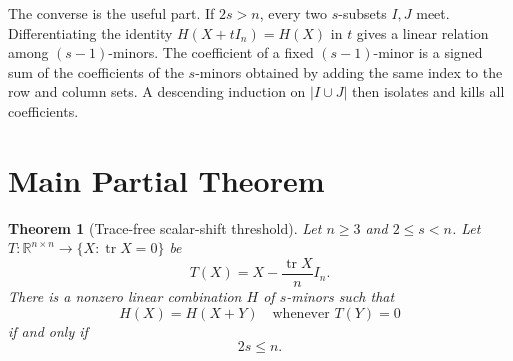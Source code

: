 \documentclass[11pt]{article}
\newtheorem{theorem}{Theorem}
\newcommand{\R}{\mathbb R}
\newcommand{\tr}{\operatorname{tr}}
\begin{document}
The converse is the useful part. If $2s>n$, every two $s$-subsets $I,J$ meet.
Differentiating the identity $H(X+tI_n)=H(X)$ in $t$ gives a linear relation
among $(s-1)$-minors. The coefficient of a fixed $(s-1)$-minor is a signed sum
of the coefficients of the $s$-minors obtained by adding the same index to the
row and column sets. A descending induction on $|I\cup J|$ then isolates and
kills all coefficients.

\section*{Main Partial Theorem}

\begin{theorem}[Trace-free scalar-shift threshold]
\label{thm:main}
Let $n\ge3$ and $2\le s<n$. Let $T:\R^{n\times n}\to\{X:\tr X=0\}$ be
\[
  T(X)=X-\frac{\tr X}{n}I_n.
\]
There is a nonzero linear combination $H$ of $s$-minors such that
\[
  H(X)=H(X+Y)\quad\text{whenever }T(Y)=0
\]
if and only if
\[
  2s\le n.
\]
\end{theorem}
\end{document}
